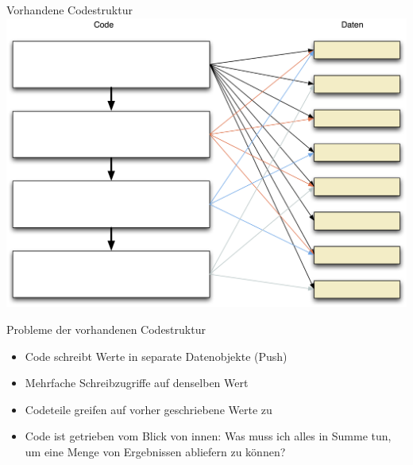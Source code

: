 \begin{frame}[fragile]{Vorhandene Codestruktur}
\includegraphics[width=.8 \paperwidth]{Codestruktur.png}
\end{frame}

\begin{frame}[fragile]{Probleme der vorhandenen Codestruktur}
\begin{itemize}
\item Code schreibt Werte in separate Datenobjekte (\glqq Push\grqq{})
\item Mehrfache Schreibzugriffe auf denselben Wert
\item Codeteile greifen auf vorher geschriebene Werte zu
\item Code ist getrieben vom Blick von innen: Was muss ich alles in Summe tun, um eine Menge von Ergebnissen abliefern zu können?
\end{itemize}
\end{frame}



